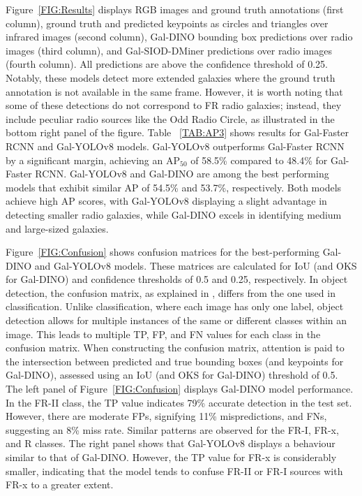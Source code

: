 \documentclass[
  journal=pasa,
  manuscript=research-paper, %
  year=2020,
  volume=37,
]{cup-journal}
\begin{document}
Figure~\ref{FIG:Results} displays RGB images and ground truth annotations (first column), ground truth and predicted keypoints as circles and triangles over infrared images (second column), Gal-DINO bounding box predictions over radio images (third column), and Gal-SIOD-DMiner predictions over radio images (fourth column). All predictions are above the confidence threshold of 0.25. 
Notably, these models detect more extended galaxies where the ground truth annotation is not available in the same frame.
However, it is worth noting that some of these detections do not correspond to FR radio galaxies; instead, they include peculiar radio sources like the Odd Radio Circle, as illustrated in the bottom right panel of the figure.
Table ~\ref{TAB:AP3} shows results for Gal-Faster RCNN and Gal-YOLOv8 models. 
Gal-YOLOv8 outperforms Gal-Faster RCNN by a significant margin, achieving an AP$_{50}$ of 58.5\% compared to 48.4\% for Gal-Faster RCNN. 
Gal-YOLOv8 and Gal-DINO are among the best performing models that exhibit similar AP of 54.5\% and 53.7\%, respectively. 
Both models achieve high AP scores, with Gal-YOLOv8 displaying a slight advantage in detecting smaller radio galaxies, while Gal-DINO excels in identifying medium and large-sized galaxies.

Figure~\ref{FIG:Confusion} shows confusion matrices for the best-performing Gal-DINO and Gal-YOLOv8 models. 
These matrices are calculated for IoU (and OKS for Gal-DINO) and confidence thresholds of 0.5 and 0.25, respectively.
In object detection, the confusion matrix, as explained in \citet{gupta2023a}, differs from the one used in classification. 
Unlike classification, where each image has only one label, object detection allows for multiple instances of the same or different classes within an image. 
This leads to multiple TP, FP, and FN values for each class in the confusion matrix. 
When constructing the confusion matrix, attention is paid to the intersection between predicted and true bounding boxes (and keypoints for Gal-DINO), assessed using an IoU (and OKS for Gal-DINO) threshold of 0.5.
The left panel of Figure~\ref{FIG:Confusion} displays Gal-DINO model performance. In the FR-II class, the TP value indicates 79\% accurate detection in the test set. However, there are moderate FPs, signifying 11\% mispredictions, and FNs, suggesting an 8\% miss rate. Similar patterns are observed for the FR-I, FR-x, and R classes.
The right panel shows that Gal-YOLOv8 displays a behaviour similar to that of Gal-DINO. However, the TP value for FR-x is considerably smaller, indicating that the model tends to confuse FR-II or FR-I sources with FR-x to a greater extent.
\end{document}
